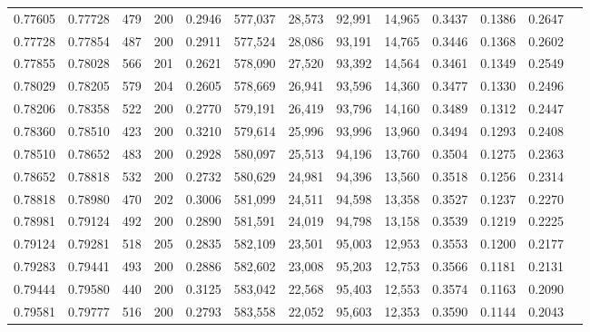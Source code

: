 \begin{tabular}{rrrrrrrrrrrrr}
0.77605 & 0.77728 &   479 & 200 &                                     0.2946 & 577,037 &  28,573 &  92,991 &  14,965 & 0.3437 & 0.1386 & 0.2647 \\
0.77728 & 0.77854 &   487 & 200 &                                     0.2911 & 577,524 &  28,086 &  93,191 &  14,765 & 0.3446 & 0.1368 & 0.2602 \\
0.77855 & 0.78028 &   566 & 201 &                                     0.2621 & 578,090 &  27,520 &  93,392 &  14,564 & 0.3461 & 0.1349 & 0.2549 \\
0.78029 & 0.78205 &   579 & 204 &                                     0.2605 & 578,669 &  26,941 &  93,596 &  14,360 & 0.3477 & 0.1330 & 0.2496 \\
0.78206 & 0.78358 &   522 & 200 &                                     0.2770 & 579,191 &  26,419 &  93,796 &  14,160 & 0.3489 & 0.1312 & 0.2447 \\
0.78360 & 0.78510 &   423 & 200 &                                     0.3210 & 579,614 &  25,996 &  93,996 &  13,960 & 0.3494 & 0.1293 & 0.2408 \\
0.78510 & 0.78652 &   483 & 200 &                                     0.2928 & 580,097 &  25,513 &  94,196 &  13,760 & 0.3504 & 0.1275 & 0.2363 \\
0.78652 & 0.78818 &   532 & 200 &                                     0.2732 & 580,629 &  24,981 &  94,396 &  13,560 & 0.3518 & 0.1256 & 0.2314 \\
0.78818 & 0.78980 &   470 & 202 &                                     0.3006 & 581,099 &  24,511 &  94,598 &  13,358 & 0.3527 & 0.1237 & 0.2270 \\
0.78981 & 0.79124 &   492 & 200 &                                     0.2890 & 581,591 &  24,019 &  94,798 &  13,158 & 0.3539 & 0.1219 & 0.2225 \\
0.79124 & 0.79281 &   518 & 205 &                                     0.2835 & 582,109 &  23,501 &  95,003 &  12,953 & 0.3553 & 0.1200 & 0.2177 \\
0.79283 & 0.79441 &   493 & 200 &                                     0.2886 & 582,602 &  23,008 &  95,203 &  12,753 & 0.3566 & 0.1181 & 0.2131 \\
0.79444 & 0.79580 &   440 & 200 &                                     0.3125 & 583,042 &  22,568 &  95,403 &  12,553 & 0.3574 & 0.1163 & 0.2090 \\
0.79581 & 0.79777 &   516 & 200 &                                     0.2793 & 583,558 &  22,052 &  95,603 &  12,353 & 0.3590 & 0.1144 & 0.2043 \\

\end{tabular}
